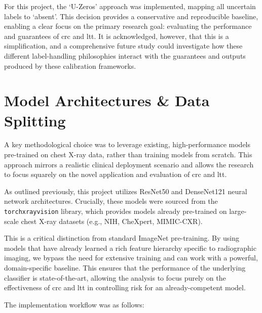 For this project, the `U-Zeros' approach was implemented,
mapping all uncertain labels to `absent'.
This decision provides a conservative and reproducible baseline,
enabling a clear focus on the primary research goal:
evaluating the performance and guarantees of \gls{crc} and \gls{ltt}.
It is acknowledged, however, that this is a simplification, and a comprehensive future study
could investigate how these different label-handling philosophies interact
with the guarantees and outputs produced by these calibration frameworks.

\section{Model Architectures \& Data Splitting}

A key methodological choice was to leverage existing, high-performance models
pre-trained on chest X-ray data, rather than training models from scratch.
This approach mirrors a realistic clinical deployment scenario
and allows the research to focus squarely on the novel application
and evaluation of \gls{crc} and \gls{ltt}.

As outlined previously, this project utilizes ResNet50 and DenseNet121 neural network architectures.
Crucially, these models were sourced from the \texttt{torchxrayvision} library,
which provides models already pre-trained on large-scale chest X-ray datasets
(e.g., NIH, CheXpert, MIMIC-CXR).

This is a critical distinction from standard ImageNet pre-training.
By using models that have already learned a rich feature hierarchy specific to radiographic imaging,
we bypass the need for extensive training and can work with a powerful, domain-specific baseline.
This ensures that the performance of the underlying classifier is state-of-the-art,
allowing the analysis to focus purely on the effectiveness of \gls{crc} and \gls{ltt}
in controlling risk for an already-competent model.

The implementation workflow was as follows:

